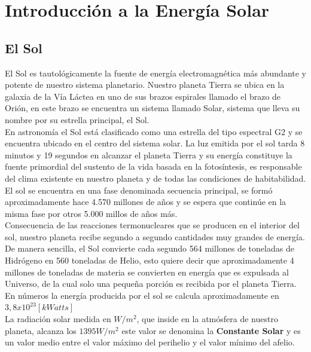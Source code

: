 \chapter{Introducción a la Energía Solar}
\label{solar}

\section{El Sol}
El Sol es tautológicamente la fuente de energía electromagnética más abundante y potente de nuestro sistema planetario. Nuestro planeta Tierra se ubica en la galaxia de la Vía Láctea en uno de sus brazos espirales llamado el brazo de Orión, en este brazo se encuentra un sistema llamado Solar\cite{solar:1}, sistema que lleva su nombre por su estrella principal, el Sol.\\

En astronomía el Sol está clasificado como una estrella del tipo espectral G2 y se encuentra ubicado en el centro del sistema solar. La luz emitida por el sol tarda 8 minutos y 19 segundos\cite{solar:2} en alcanzar el planeta Tierra y su energía constituye la fuente primordial del sustento de la vida basada en la fotosíntesis, es responsable del clima existente en nuestro planeta y de todas las condiciones de habitabilidad.\\

El sol se encuentra en una fase denominada secuencia principal, se formó aproximadamente hace 4.570 millones de años y se espera que continúe en la misma fase por otros 5.000 millos de años más\cite{solar:4}.\\
Consecuencia de las reacciones termonucleares que se producen en el interior del sol, nuestro planeta recibe segundo a segundo cantidades muy grandes de energía. De manera sencilla, el Sol convierte cada segundo 564 millones de toneladas de Hidrógeno en 560 toneladas de Helio, esto quiere decir que aproximadamente 4 millones de toneladas de materia se convierten en energía que es expulsada al Universo, de la cual solo una pequeña porción es recibida por el planeta Tierra. En números la energía producida por el sol se calcula aproximadamente en $3,8 x {10}^{23} [kWatts]$\cite{solar:3}\\

La radiación solar medida en $W/{m}^{2}$, que inside en la atmósfera de nuestro planeta, alcanza los $1395 W/{m}^{2}$ este valor se denomina la \textbf{Constante Solar} y es un valor medio entre el valor máximo del perihelio y el valor mínimo del afelio.\\

